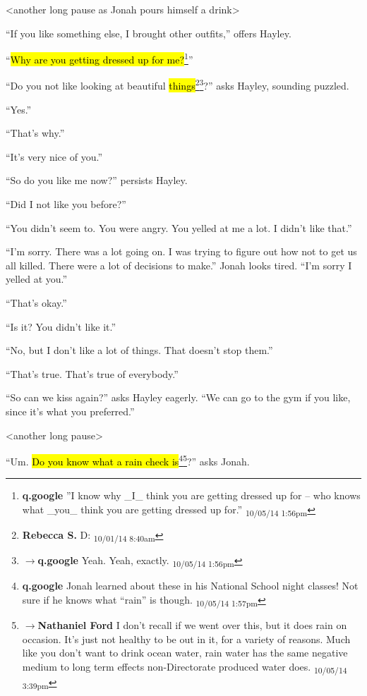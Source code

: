 \textless another long pause as Jonah pours himself a drink\textgreater 

``If you like something else, I brought other outfits,'' offers Hayley.

``\hl{Why are you getting dressed up for me?}\footnote{\textbf{q.google }''I know why \_I\_ think you are getting dressed up for -- who knows what \_you\_ think you are getting dressed up for.'' \textsubscript{10/05/14 1:56pm}}''

``Do you not like looking at beautiful \hl{things}\footnote{\textbf{Rebecca S. }D: \textsubscript{10/01/14 8:40am}}\footnote{$\rightarrow$\textbf{q.google }Yeah.  Yeah, exactly. \textsubscript{10/05/14 1:56pm}}?'' asks Hayley, sounding puzzled.

``Yes.''

``That's why.''

``It's very nice of you.''

``So do you like me now?'' persists Hayley.

``Did I not like you before?''

``You didn't seem to.  You were angry.  You yelled at me a lot.  I didn't like that.''

``I'm sorry.  There was a lot going on.  I was trying to figure out how not to get us all killed.  There were a lot of decisions to make.''  Jonah looks tired. ``I'm sorry I yelled at you.''

``That's okay.''

``Is it?  You didn't like it.''

``No, but I don't like a lot of things.  That doesn't stop them.''

``That's true.  That's true of everybody.''

``So can we kiss again?'' asks Hayley eagerly.  ``We can go to the gym if you like, since it's what you preferred.''

\textless another long pause\textgreater 

``Um.  \hl{Do you know what a rain check is}\footnote{\textbf{q.google }Jonah learned about these in his National School night classes!  Not sure if he knows what ``rain'' is though. \textsubscript{10/05/14 1:57pm}}\footnote{$\rightarrow$\textbf{Nathaniel Ford }I don't recall if we went over this, but it does rain on occasion. It's just not healthy to be out in it, for a variety of reasons. Much like you don't want to drink ocean water, rain water has the same negative medium to long term effects non-Directorate produced water does. \textsubscript{10/05/14 3:39pm}}?'' asks Jonah.

